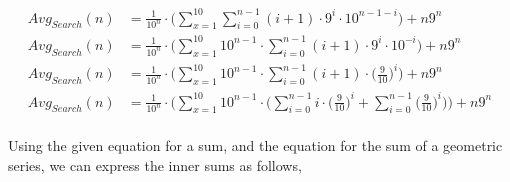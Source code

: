 \documentclass{article}
\begin{document}
\begin{enumerate}
	\begin{align*}
	 Avg_{Search}(n) &= \frac{1}{10^n} \cdot \Bigg( \sum_{x=1}^{10} \sum_{i = 0}^{n-1} (i +1) \cdot 9^i \cdot 10^{n-1-i}\Bigg) + n9^n\\
	Avg_{Search}(n) &= \frac{1}{10^n} \cdot \Bigg( \sum_{x=1}^{10} 10^{n-1} \cdot \sum_{i = 0}^{n-1} (i +1) \cdot 9^i \cdot 10^{-i}\Bigg)  +n9^n\\
	Avg_{Search}(n) &= \frac{1}{10^n} \cdot \Bigg( \sum_{x=1}^{10}  10^{n-1} \cdot \sum_{i = 0}^{n-1} (i +1) \cdot \Big( \frac{9}{10}\Big)^i \Bigg)  + n9^n\\
	Avg_{Search}(n) &= \frac{1}{10^n} \cdot \Bigg( \sum_{x=1}^{10}  10^{n-1} \cdot \bigg( \sum_{i = 0}^{n-1} i \cdot  \Big( \frac{9}{10}\Big)^i + \sum_{i = 0}^{n-1} \Big( \frac{9}{10}\Big)^i \bigg) \Bigg)  + n9^n\\
	\end{align*}
	
	Using the given equation for a sum, and the equation for the sum of a geometric series, we can express the inner sums as follows, 
	

\end{enumerate}
\end{document}
